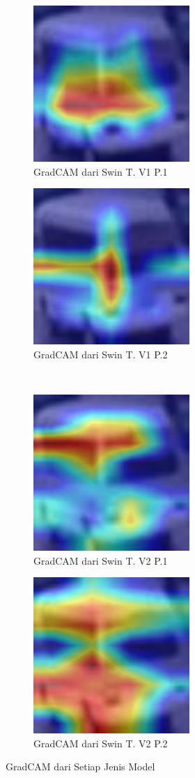 \begin{figure}[h!]
  \centering
  \begin{subfigure}{.5\textwidth}
    \centering
    \includegraphics[width=.3\linewidth]{gambar/Que8_GradCAMV1P1IT3.jpg}
    \caption{GradCAM dari Swin T. V1 P.1}
    \label{gradcamkuerinomordelapanV1P1}
  \end{subfigure}%
  \begin{subfigure}{.5\textwidth}
    \centering
    \includegraphics[width=.3\linewidth]{gambar/Que8_gradCAMV1P2IT2.jpg}
    \caption{GradCAM dari Swin T. V1 P.2}
    \label{gradcamkuerinomordelapanV1P2}
  \end{subfigure}%
  \\
  \begin{subfigure}{.5\textwidth}
    \centering
    \includegraphics[width=.3\linewidth]{gambar/Que8_V2P1IT1.png}
    \caption{GradCAM dari Swin T. V2 P.1}
    \label{gradcamkuerinomordelapanV2P1}
  \end{subfigure}%
  \begin{subfigure}{.5\textwidth}
    \centering
    \includegraphics[width=.3\linewidth]{gambar/Que8_V2P2IT3.png}
    \caption{GradCAM dari Swin T. V2 P.2}
    \label{gradcamkuerinomordelapanV2P2}
  \end{subfigure}
  \caption{GradCAM dari Setiap Jenis Model}
  \label{fig:gradcamdarisetiapjenismodelpengujianpertama}
\end{figure}



